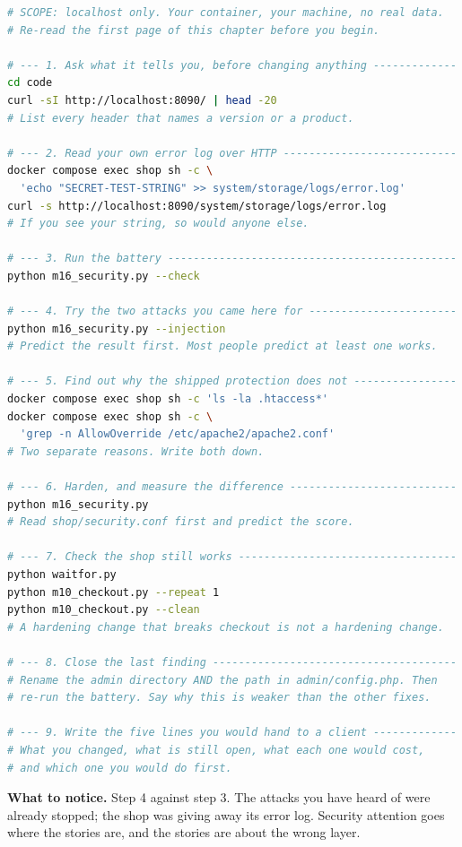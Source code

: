 \begin{lab}
\begin{lstlisting}[language=bash]
# SCOPE: localhost only. Your container, your machine, no real data.
# Re-read the first page of this chapter before you begin.

# --- 1. Ask what it tells you, before changing anything -------------
cd code
curl -sI http://localhost:8090/ | head -20
# List every header that names a version or a product.

# --- 2. Read your own error log over HTTP ---------------------------
docker compose exec shop sh -c \
  'echo "SECRET-TEST-STRING" >> system/storage/logs/error.log'
curl -s http://localhost:8090/system/storage/logs/error.log
# If you see your string, so would anyone else.

# --- 3. Run the battery ---------------------------------------------
python m16_security.py --check

# --- 4. Try the two attacks you came here for -----------------------
python m16_security.py --injection
# Predict the result first. Most people predict at least one works.

# --- 5. Find out why the shipped protection does not ----------------
docker compose exec shop sh -c 'ls -la .htaccess*'
docker compose exec shop sh -c \
  'grep -n AllowOverride /etc/apache2/apache2.conf'
# Two separate reasons. Write both down.

# --- 6. Harden, and measure the difference --------------------------
python m16_security.py
# Read shop/security.conf first and predict the score.

# --- 7. Check the shop still works ----------------------------------
python waitfor.py
python m10_checkout.py --repeat 1
python m10_checkout.py --clean
# A hardening change that breaks checkout is not a hardening change.

# --- 8. Close the last finding --------------------------------------
# Rename the admin directory AND the path in admin/config.php. Then
# re-run the battery. Say why this is weaker than the other fixes.

# --- 9. Write the five lines you would hand to a client -------------
# What you changed, what is still open, what each one would cost,
# and which one you would do first.
\end{lstlisting}

\smallskip
\textbf{What to notice.} Step 4 against step 3. The attacks you have heard of
were already stopped; the shop was giving away its error log. Security attention
goes where the stories are, and the stories are about the wrong layer.
\end{lab}

